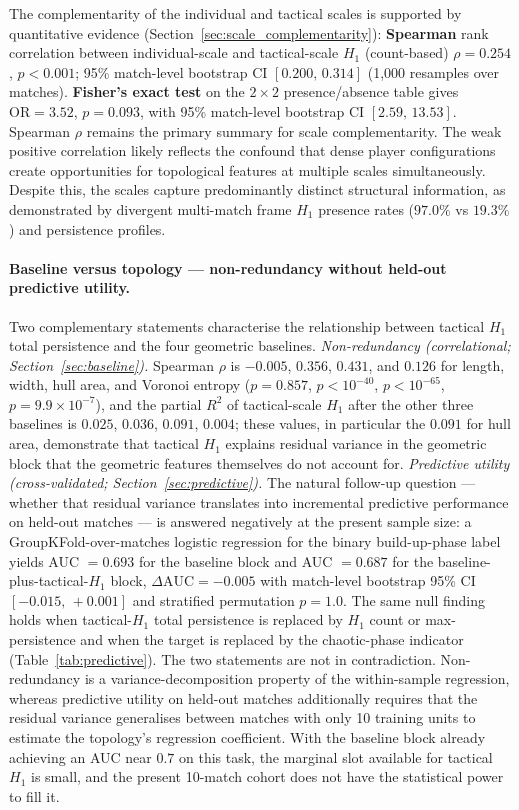 The complementarity of the individual and tactical scales is supported by quantitative evidence (Section~\ref{sec:scale_complementarity}): \textbf{Spearman} rank correlation between individual-scale and tactical-scale \(H_1\) (count-based) \(\rho=0.254\), \(p<0.001\); 95\% match-level bootstrap CI \([0.200,\,0.314]\) (1{,}000 resamples over matches). \textbf{Fisher's exact test} on the \(2\times2\) presence/absence table gives \(\mathrm{OR}=3.52\), \(p=0.093\), with 95\% match-level bootstrap CI \([2.59,\,13.53]\). Spearman \(\rho\) remains the primary summary for scale complementarity. The weak positive correlation likely reflects the confound that dense player configurations create opportunities for topological features at multiple scales simultaneously. Despite this, the scales capture predominantly distinct structural information, as demonstrated by divergent multi-match frame \(H_1\) presence rates ($97.0\%$ vs $19.3\%$) and persistence profiles.

\paragraph{Baseline versus topology --- non-redundancy without held-out predictive utility.}
Two complementary statements characterise the relationship between tactical \(H_1\) total persistence and the four geometric baselines. \emph{Non-redundancy (correlational; Section~\ref{sec:baseline}).} Spearman \(\rho\) is \(-0.005\), \(0.356\), \(0.431\), and \(0.126\) for length, width, hull area, and Voronoi entropy (\(p=0.857\), \(p<10^{-40}\), \(p<10^{-65}\), \(p=9.9\times10^{-7}\)), and the partial \(R^2\) of tactical-scale \(H_1\) after the other three baselines is \(0.025\), \(0.036\), \(0.091\), \(0.004\); these values, in particular the \(0.091\) for hull area, demonstrate that tactical \(H_1\) explains residual variance in the geometric block that the geometric features themselves do not account for. \emph{Predictive utility (cross-validated; Section~\ref{sec:predictive}).} The natural follow-up question --- whether that residual variance translates into incremental predictive performance on held-out matches --- is answered negatively at the present sample size: a GroupKFold-over-matches logistic regression for the binary build-up-phase label yields AUC \(=0.693\) for the baseline block and AUC \(=0.687\) for the baseline-plus-tactical-\(H_1\) block, \(\Delta\text{AUC}=-0.005\) with match-level bootstrap 95\% CI \([-0.015,\,+0.001]\) and stratified permutation \(p=1.0\). The same null finding holds when tactical-\(H_1\) total persistence is replaced by \(H_1\) count or max-persistence and when the target is replaced by the chaotic-phase indicator (Table~\ref{tab:predictive}). The two statements are not in contradiction. Non-redundancy is a variance-decomposition property of the within-sample regression, whereas predictive utility on held-out matches additionally requires that the residual variance generalises between matches with only 10 training units to estimate the topology's regression coefficient. With the baseline block already achieving an AUC near \(0.7\) on this task, the marginal slot available for tactical \(H_1\) is small, and the present 10-match cohort does not have the statistical power to fill it.


